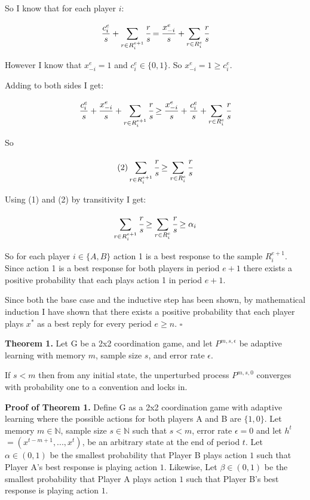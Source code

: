\documentclass{article}
\begin{document}
So I know that for each player $i$:

$$\frac{c_i^{e}}{s} + \sum\limits_{r \in R_i^{e+1}} \cfrac{r}{s} = \frac{x_{-i}^{e}}{s} + \sum\limits_{r \in R_i^{e}} \cfrac{r}{s}$$

However I know that $x_{-i}^{e}=1$ and $c_i^{e} \in \{0,1\}$. So $x_{-i}^{e}=1 \geq c_i^{e}$.

Adding to both sides I get:

$$\frac{c_i^{e}}{s} + \frac{x_{-i}^{e}}{s} + \sum\limits_{r \in R_i^{e+1}} \cfrac{r}{s} \geq \frac{x_{-i}^{e}}{s} + \frac{c_i^{e}}{s} + \sum\limits_{r \in R_i^{e}} \cfrac{r}{s}$$

So

$$(2) \sum\limits_{r \in R_i^{e+1}} \cfrac{r}{s} \geq \sum\limits_{r \in R_i^{e}} \cfrac{r}{s}$$

Using (1) and (2) by transitivity I get:

$$\sum\limits_{r \in R_i^{e+1}} \cfrac{r}{s} \geq \sum\limits_{r \in R_i^{e}} \cfrac{r}{s} \geq \alpha_i$$

So for each player $i \in \{A,B\}$ action 1 is a best response to the sample $R_i^{e+1}$. Since action 1 is a best response for both players in period $e+1$ there exists a positive probability that each plays action 1 in period $e+1$.

\vskip6pt

Since both the base case and the inductive step has been shown, by mathematical induction I have shown that there exists a positive probability that each player plays $x^*$ as a best reply for every period $e \geq n$. $\square$

\pagebreak

\textbf{Theorem 1.} Let G be a 2x2 coordination game, and let $P^{m,s,\epsilon}$ be adaptive learning with memory $m$, sample size $s$, and error rate $\epsilon$.

\vskip12pt

If $s < m$ then from any initial state, the unperturbed process $P^{m,s,0}$ converges with probability one to a convention and locks in.

\vskip24pt

\textbf{Proof of Theorem 1.} Define G as a 2x2 coordination game with adaptive learning where the possible actions for both players A and B are $\{1 ,0 \}$. Let memory $m \in \mathds{N}$, sample size $s \in \mathds{N}$ such that $s<m$, error rate $\epsilon = 0$ and let $h^t$ $= (x^{t-m+1},...,x^{t})$, be an arbitrary state at the end of period $t$. Let $\alpha \in (0,1)$ be the smallest probability that Player B plays action $1$ such that Player A's best response is playing action $1$. Likewise, Let $\beta \in (0,1)$ be the smallest probability that Player A plays action $1$ such that Player B's best response is playing action $1$. 
\end{document}
